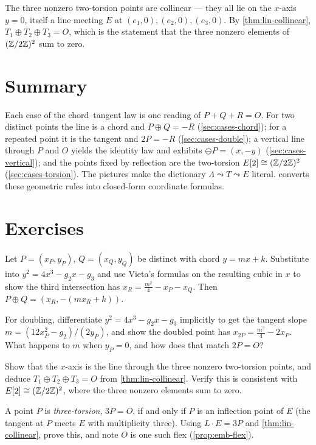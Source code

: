 The three nonzero two-torsion points are collinear --- they all lie on the
\(x\)-axis \(y = 0\), itself a line meeting \(E\) at \((e_1,0), (e_2,0), (e_3,0)\).
By \cref{thm:lin-collinear}, \(T_1 \oplus T_2 \oplus T_3 = O\), which is the
statement that the three nonzero elements of \((\mathbb{Z}/2\mathbb{Z})^2\) sum to zero.

\section{Summary}
\label{sec:cases-summary}

Each case of the chord--tangent law is one reading of \(P + Q + R = O\). For two
distinct points the line is a chord and \(P \oplus Q = -R\)
(\cref{sec:cases-chord}); for a repeated point it is the tangent and \(2P = -R\)
(\cref{sec:cases-double}); a vertical line through \(P\) and \(O\) yields the
identity law and exhibits \(\ominus P = (x,-y)\) (\cref{sec:cases-vertical}); and
the points fixed by reflection are the two-torsion \(E[2] \cong (\mathbb{Z}/2\mathbb{Z})^2\)
(\cref{sec:cases-torsion}). The pictures make the dictionary
\(\Lambda \leadsto T \leadsto E\) literal.  converts
these geometric rules into closed-form coordinate formulas.

\section*{Exercises}

\begin{exercise}
\label{ex:cases-chord-vieta}
Let \(P = (x_P, y_P)\), \(Q = (x_Q, y_Q)\) be distinct with chord \(y = mx + k\).
Substitute into \(y^2 = 4x^3 - g_2 x - g_3\) and use Vieta's formulas on the
resulting cubic in \(x\) to show the third intersection has
\(x_R = \tfrac{m^2}{4} - x_P - x_Q\). Then \(P \oplus Q = (x_R, -(m x_R + k))\).
\end{exercise}

\begin{exercise}
\label{ex:cases-tangent-slope}
For doubling, differentiate \(y^2 = 4x^3 - g_2 x - g_3\) implicitly to get the
tangent slope \(m = (12 x_P^2 - g_2)/(2 y_P)\), and show the doubled point has
\(x_{2P} = \tfrac{m^2}{4} - 2 x_P\). What happens to \(m\) when \(y_P = 0\), and
how does that match \(2P = O\)?
\end{exercise}

\begin{exercise}
\label{ex:cases-two-torsion-sum}
Show that the \(x\)-axis is the line through the three nonzero two-torsion points,
and deduce \(T_1 \oplus T_2 \oplus T_3 = O\) from \cref{thm:lin-collinear}.
Verify this is consistent with \(E[2] \cong (\mathbb{Z}/2\mathbb{Z})^2\), where the three nonzero
elements sum to zero.
\end{exercise}

\begin{exercise}
\label{ex:cases-flex-three-torsion}
A point \(P\) is \emph{three-torsion}, \(3P = O\), if and only if \(P\) is an
inflection point of \(E\) (the tangent at \(P\) meets \(E\) with multiplicity
three). Using \(L \cdot E = 3P\) and \cref{thm:lin-collinear}, prove this, and note
\(O\) is one such flex (\cref{prop:emb-flex}).
\end{exercise}
